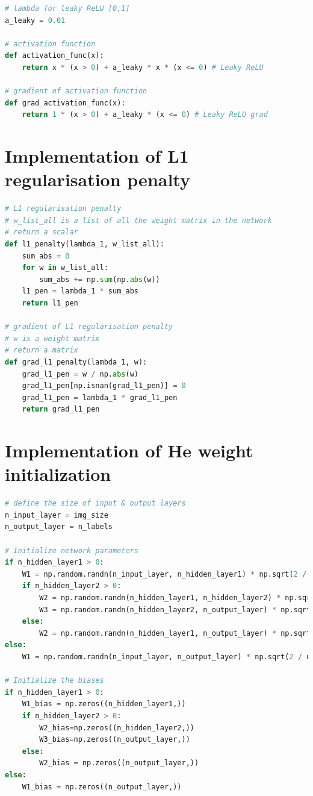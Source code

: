 \documentclass[conference]{IEEEtran}
\begin{document}
\begin{lstlisting}[language=Python]
# lambda for leaky ReLU [0,1]
a_leaky = 0.01

# activation function
def activation_func(x):
    return x * (x > 0) + a_leaky * x * (x <= 0) # Leaky ReLU

# gradient of activation function 
def grad_activation_func(x):
    return 1 * (x > 0) + a_leaky * (x <= 0) # Leaky ReLU grad

\end{lstlisting}

\section{Implementation of L1 regularisation penalty}

\begin{lstlisting}[language=Python]
# L1 regularisation penalty
# w_list_all is a list of all the weight matrix in the network
# return a scalar
def l1_penalty(lambda_1, w_list_all):
    sum_abs = 0
    for w in w_list_all:
        sum_abs += np.sum(np.abs(w))
    l1_pen = lambda_1 * sum_abs
    return l1_pen

# gradient of L1 regularisation penalty
# w is a weight matrix
# return a matrix
def grad_l1_penalty(lambda_1, w):
    grad_l1_pen = w / np.abs(w)
    grad_l1_pen[np.isnan(grad_l1_pen)] = 0
    grad_l1_pen = lambda_1 * grad_l1_pen
    return grad_l1_pen

\end{lstlisting}

\section{Implementation of He weight initialization}

\begin{lstlisting}[language=Python]
# define the size of input & output layers 
n_input_layer = img_size
n_output_layer = n_labels

# Initialize network parameters
if n_hidden_layer1 > 0:
    W1 = np.random.randn(n_input_layer, n_hidden_layer1) * np.sqrt(2 / n_input_layer)
    if n_hidden_layer2 > 0:
        W2 = np.random.randn(n_hidden_layer1, n_hidden_layer2) * np.sqrt(2 / n_hidden_layer1)
        W3 = np.random.randn(n_hidden_layer2, n_output_layer) * np.sqrt(2 / n_hidden_layer2)
    else:
        W2 = np.random.randn(n_hidden_layer1, n_output_layer) * np.sqrt(2 / n_hidden_layer1)
else:
    W1 = np.random.randn(n_input_layer, n_output_layer) * np.sqrt(2 / n_input_layer)

# Initialize the biases
if n_hidden_layer1 > 0:
    W1_bias = np.zeros((n_hidden_layer1,))
    if n_hidden_layer2 > 0:   
        W2_bias=np.zeros((n_hidden_layer2,))
        W3_bias=np.zeros((n_output_layer,))
    else:
        W2_bias = np.zeros((n_output_layer,))
else:
    W1_bias = np.zeros((n_output_layer,))

\end{lstlisting}
\end{document}
